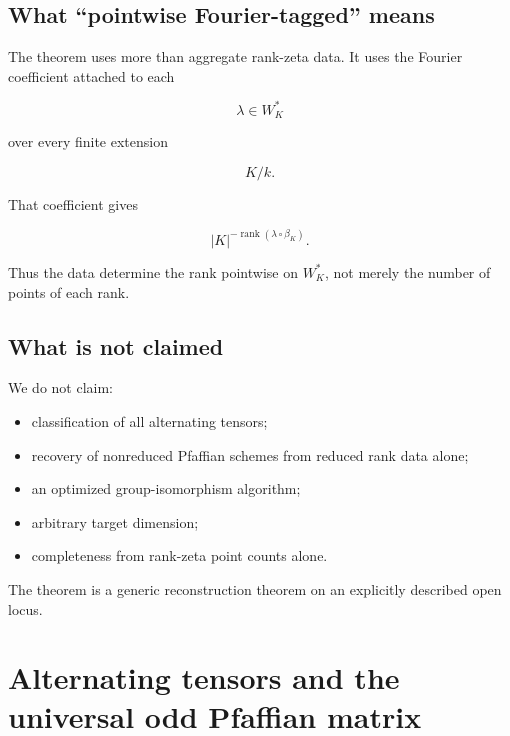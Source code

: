 \documentclass[11pt]{article}
\begin{document}
\subsection{What ``pointwise Fourier-tagged'' means}

The theorem uses more than aggregate rank-zeta data. It uses the Fourier coefficient attached to each

\[
\lambda\in W_K^*
\]

over every finite extension

\[
K/k.
\]

That coefficient gives

\[
|K|^{-\operatorname{rank}(\lambda\circ\beta_K)}.
\]

Thus the data determine the rank pointwise on $W_K^*$, not merely the number of points of each rank.

\subsection{What is not claimed}

We do not claim:

\begin{itemize}
\item classification of all alternating tensors;
\end{itemize}

\begin{itemize}
\item recovery of nonreduced Pfaffian schemes from reduced rank data alone;
\end{itemize}

\begin{itemize}
\item an optimized group-isomorphism algorithm;
\end{itemize}

\begin{itemize}
\item arbitrary target dimension;
\end{itemize}

\begin{itemize}
\item completeness from rank-zeta point counts alone.
\end{itemize}

The theorem is a generic reconstruction theorem on an explicitly described open locus.

\section{Alternating tensors and the universal odd Pfaffian matrix}
\end{document}
